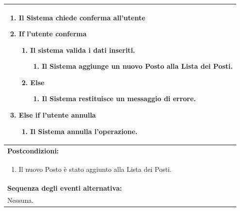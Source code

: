 \documentclass{article}
\begin{document}
\begin{table}[H]
\begin{tabular}{|p{\linewidth}|}
\begin{enumerate}
                            \item Il Sistema chiede conferma all'utente
                            \item  \textbf{If} l'utente conferma
                            \begin{enumerate}
                                \item Il sistema valida i dati inseriti.
                                \begin{enumerate}
                                    \item Il Sistema aggiunge un nuovo Posto alla Lista dei Posti.
                                \end{enumerate}
                                \item \textbf{Else}
                                \begin{enumerate}
                                    \item Il Sistema restituisce un messaggio di errore.
                                \end{enumerate}
                            \end{enumerate}
                            \item \textbf{Else if} l'utente annulla
                            \begin{enumerate}
                                \item Il Sistema annulla l'operazione.
                            \end{enumerate}
                        \end{enumerate} \\
                        \hline
                        \cellcolor{gray!20}
                        \textbf{Postcondizioni:} \\
                        \cellcolor{gray!20}
                        \begin{minipage}{\linewidth}
                            \begin{enumerate}
                                \item Il nuovo Posto è stato aggiunto alla Lista dei Posti.
                            \end{enumerate}
                        \end{minipage} \\
                        \hline
                        \textbf{Sequenza degli eventi alternativa:} \\
                        Nessuna. \\
                        \hline
                    \end{tabular}
                \end{table}
                
\end{document}
